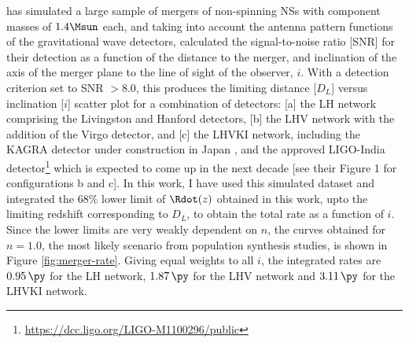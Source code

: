 \cite{Saleem_et_al.-2018-MNRAS} has simulated a large sample of mergers of non-spinning NSs with component masses of $1.4 \Msun$ each, and taking into account the antenna pattern functions of the gravitational wave detectors, calculated the signal-to-noise ratio [SNR] for their detection as a function of the distance to the merger, and inclination of the axis of the merger plane to the line of sight of the observer, $i$. With a detection criterion set to SNR $> 8.0$, this produces the limiting distance [$D_L$] versus inclination [$i$] scatter plot for a combination of detectors: [a] the LH network comprising the Livingston and Hanford detectors, [b] the LHV network with the addition of the Virgo detector, and [c] the LHVKI network, including the KAGRA detector under construction in Japan \citep{Aso_et_al.-2013-PhRvD}, and the approved LIGO-India detector\footnote{\url{https://dcc.ligo.org/LIGO-M1100296/public}} which is expected to come up in the next decade [see their Figure 1 for configurations b and c]. In this work, I have used this simulated dataset and integrated the $68 \%$ lower limit of $\Rdot(z)$ obtained in this work, upto the limiting redshift corresponding to $D_L$, to obtain the total rate as a function of $i$. Since the lower limits are very weakly dependent on $n$, the curves obtained for $n = 1.0$, the most likely scenario from population synthesis studies, is shown in Figure \ref{fig:merger-rate}. Giving equal weights to all $i$, the integrated rates are $0.95 \, \py$ for the LH network, $1.87 \, \py$ for the LHV network and $3.11 \, \py$ for the LHVKI network.


